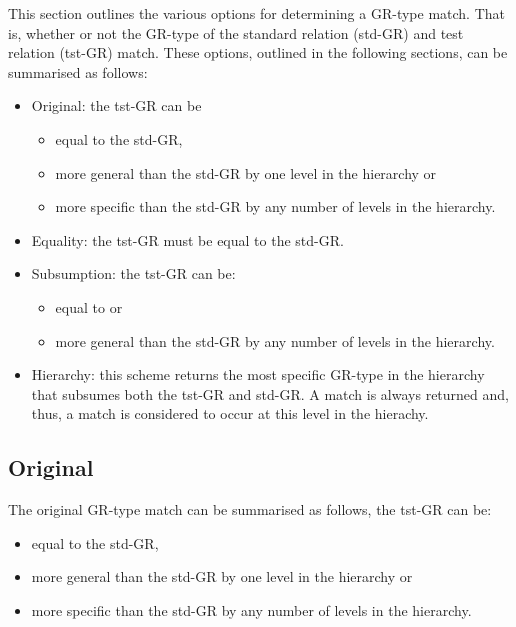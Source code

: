 \documentclass[10pt]{article}
\newcommand{\stt}[1]{{\small\texttt{#1}}}
\begin{document}
This section outlines the various options for determining
a GR-type match. That is, whether or not the GR-type of
the standard relation (std-GR) and test relation (tst-GR) match. 
These options, outlined in the following sections, 
can be summarised as follows:
\begin{itemize}
\item Original: the tst-GR can be
\begin{itemize} 
\item equal to the std-GR,
\item more general than the std-GR by one level in the hierarchy or
\item more specific than the std-GR by any number of levels in the hierarchy.
\end{itemize}
\item Equality: the tst-GR must be equal to the std-GR.
\item Subsumption: the tst-GR can be:
\begin{itemize} 
\item equal to or 
\item more general than the std-GR by any number of levels in the
  hierarchy.
\end{itemize}
\item Hierarchy: this scheme returns the most specific GR-type in the hierarchy
that subsumes both the tst-GR and std-GR. A match is always
returned and, thus, a match is considered to occur at this level in the
hierachy.
\end{itemize}


\subsection{Original}

The original GR-type match can be summarised as follows, the tst-GR can be:
\begin{itemize} 
\item equal to the std-GR,
\item more general than the std-GR by one level in the hierarchy or
\item more specific than the std-GR by any number of levels in the hierarchy.
\end{itemize}
\end{document}
